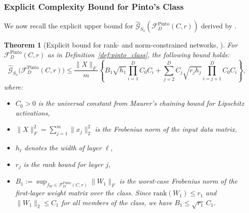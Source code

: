 \documentclass{article}
\theoremstyle{plain}
\newtheorem{theorem}{Theorem}[section]
\theoremstyle{definition}
\theoremstyle{remark}
\begin{document}
\subsubsection{Explicit Complexity Bound for Pinto's Class}

We now recall the explicit upper bound for $\hat{\mathcal{G}}_{S_x}(\mathcal{F}^{\mathrm{Pinto}}_D(C,r))$ derived by \citet{pinto2025on}.

\begin{theorem}[Explicit bound for rank- and norm-constrained networks, \citet{pinto2025on}]
\label{thm:pinto_explicit}
For $\mathcal{F}^{\mathrm{Pinto}}_D(C,r)$ as in Definition~\ref{def:pinto_class}, the following bound holds:
\[
\hat{\mathcal{G}}_{S_x}\big(\mathcal{F}^{\mathrm{Pinto}}_D(C,r)\big)
\le
\frac{\|X\|_F}{m}
\left\{
B_1\sqrt{h_1}\prod_{i=1}^D C_0 C_i
+
\sum_{j=2}^D C_j\sqrt{r_j h_j}\prod_{i=j+1}^D C_0 C_i
\right\},
\]
where:
\begin{itemize}
    \item $C_0>0$ is the universal constant from Maurer's chaining bound for Lipschitz activations,
    \item $\|X\|_F^2=\sum_{j=1}^m\|x_j\|_2^2$ is the Frobenius norm of the input data matrix,
    \item $h_\ell$ denotes the width of layer $\ell$,
    \item $r_j$ is the rank bound for layer $j$,
    \item $B_1 := \sup_{f_W \in \mathcal{F}^{\mathrm{Pinto}}_D(C,r)} \|W_1\|_F$ is the worst-case Frobenius norm of the first-layer weight matrix over the class. Since $\mathrm{rank}(W_1)\le r_1$ and $\|W_1\|_2\le C_1$ for all members of the class, we have $B_1 \le \sqrt{r_1}\,C_1$.
\end{itemize}
\end{theorem}
\end{document}
